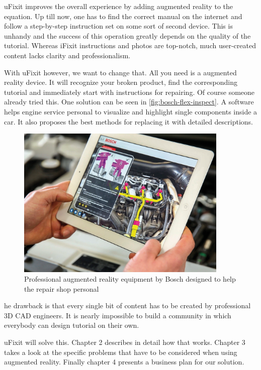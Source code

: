 	uFixit improves the overall experience by adding augmented reality to the equation. Up till now, one has to find the correct manual on the internet and follow a step-by-step instruction set on some sort of second device. This is unhandy and the success of this operation greatly depends on the quality of the tutorial. Whereas iFixit instructions and photos are top-notch, much user-created content lacks clarity and professionalism.
	
	With uFixit however, we want to change that. All you need is a augmented reality device. It will recognize your broken product, find the corresponding tutorial and immediately start with instructions for repairing. Of course someone already tried this. One solution can be seen in \autoref{fig:bosch-flex-inspect}. A software helps engine service personal to visualize and highlight single components inside a car. It also proposes the best methods for replacing it with detailed descriptions.
	
	\begin{figure}[H]
		\includegraphics[width=0.9\textwidth]{../images/bosch-flex-inspect.jpg}
		\centering
		\caption[Professional augmented reality equipment by Bosch designed to help the repair shop personal]{Professional augmented reality equipment by Bosch designed to help the repair shop personal\footnotemark}
		\label{fig:bosch-flex-inspect}
	\end{figure}
	
	he drawback is that every single bit of content has to be created by professional 3D CAD engineers. It is nearly impossible to build a community in which everybody can design tutorial on their own.
	
	uFixit will solve this. Chapter 2 describes in detail how that works. Chapter 3 takes a look at the specific problems that have to be considered when using augmented reality. Finally chapter 4 presents a business plan for our solution.

